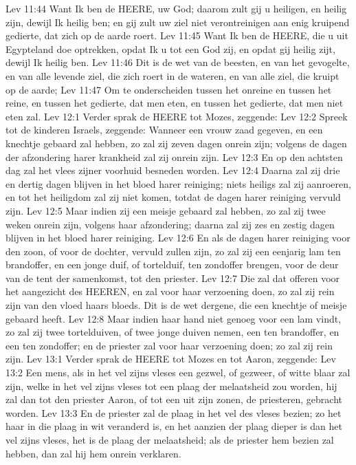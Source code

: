 Lev 11:44  Want Ik ben de HEERE, uw God; daarom zult gij u heiligen, en heilig zijn, dewijl Ik heilig ben; en gij zult uw ziel niet verontreinigen aan enig kruipend gedierte, dat zich op de aarde roert.
Lev 11:45  Want Ik ben de HEERE, die u uit Egypteland doe optrekken, opdat Ik u tot een God zij, en opdat gij heilig zijt, dewijl Ik heilig ben.
Lev 11:46  Dit is de wet van de beesten, en van het gevogelte, en van alle levende ziel, die zich roert in de wateren, en van alle ziel, die kruipt op de aarde;
Lev 11:47  Om te onderscheiden tussen het onreine en tussen het reine, en tussen het gedierte, dat men eten, en tussen het gedierte, dat men niet eten zal.
Lev 12:1  Verder sprak de HEERE tot Mozes, zeggende:
Lev 12:2  Spreek tot de kinderen Israels, zeggende: Wanneer een vrouw zaad gegeven, en een knechtje gebaard zal hebben, zo zal zij zeven dagen onrein zijn; volgens de dagen der afzondering harer krankheid zal zij onrein zijn.
Lev 12:3  En op den achtsten dag zal het vlees zijner voorhuid besneden worden.
Lev 12:4  Daarna zal zij drie en dertig dagen blijven in het bloed harer reiniging; niets heiligs zal zij aanroeren, en tot het heiligdom zal zij niet komen, totdat de dagen harer reiniging vervuld zijn.
Lev 12:5  Maar indien zij een meisje gebaard zal hebben, zo zal zij twee weken onrein zijn, volgens haar afzondering; daarna zal zij zes en zestig dagen blijven in het bloed harer reiniging.
Lev 12:6  En als de dagen harer reiniging voor den zoon, of voor de dochter, vervuld zullen zijn, zo zal zij een eenjarig lam ten brandoffer, en een jonge duif, of tortelduif, ten zondoffer brengen, voor de deur van de tent der samenkomst, tot den priester.
Lev 12:7  Die zal dat offeren voor het aangezicht des HEEREN, en zal voor haar verzoening doen, zo zal zij rein zijn van den vloed haars bloeds. Dit is de wet dergene, die een knechtje of meisje gebaard heeft.
Lev 12:8  Maar indien haar hand niet genoeg voor een lam vindt, zo zal zij twee tortelduiven, of twee jonge duiven nemen, een ten brandoffer, en een ten zondoffer; en de priester zal voor haar verzoening doen; zo zal zij rein zijn.
Lev 13:1  Verder sprak de HEERE tot Mozes en tot Aaron, zeggende:
Lev 13:2  Een mens, als in het vel zijns vleses een gezwel, of gezweer, of witte blaar zal zijn, welke in het vel zijns vleses tot een plaag der melaatsheid zou worden, hij zal dan tot den priester Aaron, of tot een uit zijn zonen, de priesteren, gebracht worden.
Lev 13:3  En de priester zal de plaag in het vel des vleses bezien; zo het haar in die plaag in wit veranderd is, en het aanzien der plaag dieper is dan het vel zijns vleses, het is de plaag der melaatsheid; als de priester hem bezien zal hebben, dan zal hij hem onrein verklaren.
